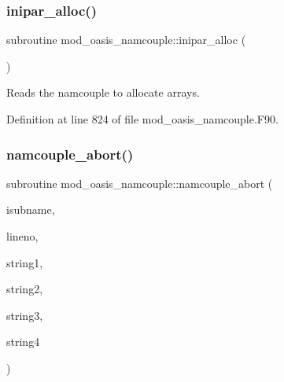 \mbox{\label{namespacemod__oasis__namcouple_acb43892c17b5f8c8b360effb5a811c27}} 
\subsubsection{\texorpdfstring{inipar\+\_\+alloc()}{inipar\_alloc()}}
{\footnotesize\ttfamily subroutine mod\+\_\+oasis\+\_\+namcouple\+::inipar\+\_\+alloc (\begin{DoxyParamCaption}{ }\end{DoxyParamCaption})\hspace{0.3cm}{\ttfamily [private]}}



Reads the namcouple to allocate arrays. 



Definition at line 824 of file mod\+\_\+oasis\+\_\+namcouple.\+F90.

\mbox{\label{namespacemod__oasis__namcouple_aefebb1d6fd8ac62ea91f9e03265440a3}} 
\subsubsection{\texorpdfstring{namcouple\+\_\+abort()}{namcouple\_abort()}}
{\footnotesize\ttfamily subroutine mod\+\_\+oasis\+\_\+namcouple\+::namcouple\+\_\+abort (\begin{DoxyParamCaption}\item[{character(len=$\ast$), intent(in)}]{isubname,  }\item[{integer, intent(in)}]{lineno,  }\item[{character(len=$\ast$), intent(in), optional}]{string1,  }\item[{character(len=$\ast$), intent(in), optional}]{string2,  }\item[{character(len=$\ast$), intent(in), optional}]{string3,  }\item[{character(len=$\ast$), intent(in), optional}]{string4 }\end{DoxyParamCaption})\hspace{0.3cm}{\ttfamily [private]}}



